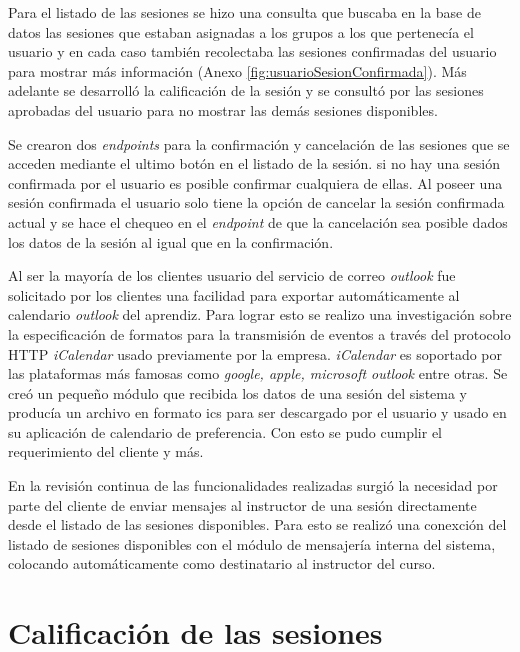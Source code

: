 	Para el listado de las sesiones se hizo una consulta que buscaba en la base de datos las sesiones que estaban asignadas a los grupos a los que pertenecía el usuario y en cada caso también recolectaba las sesiones confirmadas del usuario para mostrar más información (Anexo \ref{fig:usuarioSesionConfirmada}). Más adelante se desarrolló la calificación de la sesión y se consultó por las sesiones aprobadas del usuario para no mostrar las demás sesiones disponibles.

	Se crearon dos \emph{endpoints} para la confirmación y cancelación de las sesiones que se acceden mediante el ultimo botón en el listado de la sesión. si no hay una sesión confirmada por el usuario es posible confirmar cualquiera de ellas. Al poseer una sesión confirmada el usuario solo tiene la opción de cancelar la sesión confirmada actual y se hace el chequeo en el \emph{endpoint} de que la cancelación sea posible dados los datos de la sesión al igual que en la confirmación.

	Al ser la mayoría de los clientes usuario del servicio de correo \emph{outlook} fue solicitado por los clientes una facilidad para exportar automáticamente al calendario \emph{outlook} del aprendiz. Para lograr esto se realizo una investigación sobre la especificación de formatos para la transmisión de eventos a través del protocolo \gls{HTTP} \emph{iCalendar} usado previamente por la empresa. \emph{iCalendar} es soportado por las plataformas más famosas como \emph{google, apple, microsoft outlook} entre otras. Se creó un pequeño módulo que recibida los datos de una sesión del sistema y producía un archivo en formato ics para ser descargado por el usuario y usado en su aplicación de calendario de preferencia. Con esto se pudo cumplir el requerimiento del cliente y más.

	En la revisión continua de las funcionalidades realizadas surgió la necesidad por parte del cliente de enviar mensajes al instructor de una sesión directamente desde el listado de las sesiones disponibles. Para esto se realizó una conexción del listado de sesiones disponibles con el módulo de mensajería interna del sistema, colocando automáticamente como destinatario al instructor del curso.

	\section{Calificación de las sesiones} %
	\label{sec:calificacion_de_las_sesiones}
	
